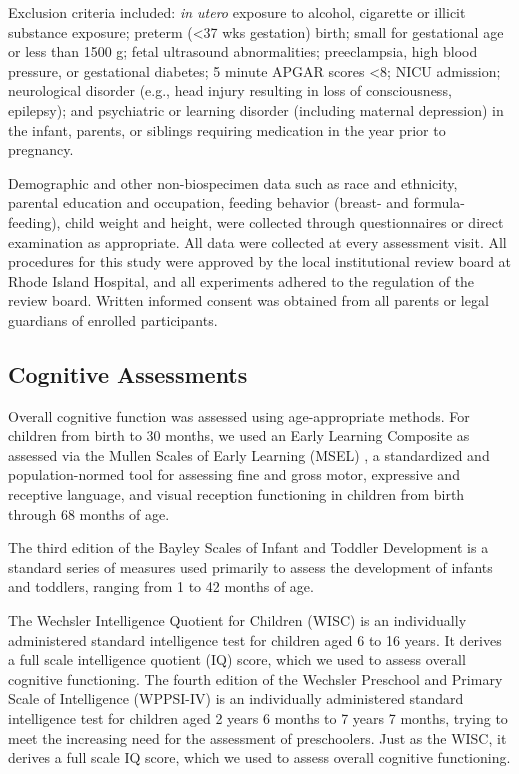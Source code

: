 \documentclass[a4paper]{article}
\begin{document}
Exclusion criteria included: \emph{in utero} exposure to alcohol, cigarette or illicit substance exposure;
preterm (<37 wks gestation) birth; small for gestational age or less than 1500 g; fetal ultrasound abnormalities;
preeclampsia, high blood pressure, or gestational diabetes; 5 minute APGAR scores <8;
NICU admission; neurological disorder (e.g., head injury resulting in loss of consciousness, epilepsy);
and psychiatric or learning disorder (including maternal depression) in the infant, parents, or siblings requiring medication in the year prior to pregnancy.

Demographic and other non-biospecimen data such as race and ethnicity, parental education and occupation,
feeding behavior (breast- and formula-feeding), child weight and height,
were collected through questionnaires or direct examination as appropriate.
All data were collected at every assessment visit.
All procedures for this study were approved by the local institutional review board at Rhode Island Hospital,
and all experiments adhered to the regulation of the review board.
Written informed consent was obtained from all parents or legal guardians of enrolled participants.


\subsection*{Cognitive Assessments}

Overall cognitive function was assessed using age-appropriate methods.
For children from birth to 30 months, we used an Early Learning Composite
as assessed via the Mullen Scales of Early Learning (MSEL) \cite{Mullen1995-ty},
a standardized and population-normed tool for assessing fine and gross motor,
expressive and receptive language, and visual reception functioning in children from birth through 68 months of age.

The third edition of the Bayley Scales of Infant and Toddler Development \cite{Bayley2006-wm}
is a standard series of measures used primarily to assess the development of infants and toddlers,
ranging from 1 to 42 months of age.

The Wechsler Intelligence Quotient for Children (WISC) \cite{Wechsler2012-mi}
is an individually administered standard intelligence test for children aged 6 to 16 years.
It derives a full scale intelligence quotient (IQ) score, which we used to assess overall cognitive functioning.
The fourth edition of the Wechsler Preschool and Primary Scale of Intelligence (WPPSI-IV) \cite{Wechsler2012-mi}
is an individually administered standard intelligence test for children aged 2 years 6 months to 7 years 7 months,
trying to meet the increasing need for the assessment of preschoolers.
Just as the WISC, it derives a full scale IQ score, which we used to assess overall cognitive functioning.
\end{document}
